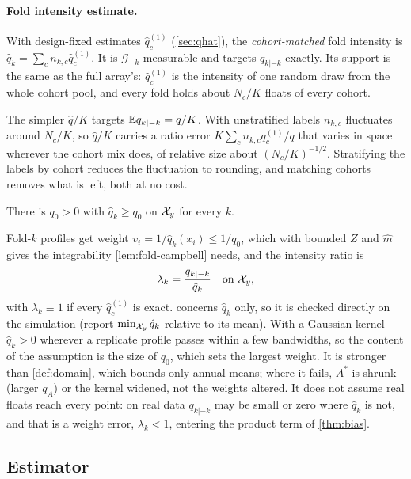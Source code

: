 \paragraph{Fold intensity estimate.} With design-fixed estimates $\hat q^{(1)}_c$ (\cref{sec:qhat}),
the \emph{cohort-matched} fold intensity is $\hat q_k=\sum_cn_{k,c}\hat q^{(1)}_c$. It is
$\mathcal G_{-k}$-measurable and targets $q_{k|-k}$ exactly. Its support is the same as the full
array's: $\hat q^{(1)}_c$ is the intensity of one random draw from the whole cohort pool, and every fold
holds about $N_c/K$ floats of every cohort.

\begin{remark}\label{rem:cohort}
The simpler $\hat q/K$ targets $\mathbb{E} q_{k|-k}=q/K$. With unstratified labels $n_{k,c}$ fluctuates around
$N_c/K$, so $\hat q/K$ carries a ratio error $K\sum_cn_{k,c}q^{(1)}_c/q$ that varies in space wherever
the cohort mix does, of relative size about $(N_c/K)^{-1/2}$. Stratifying the labels by cohort reduces
the fluctuation to rounding, and matching cohorts removes what is left, both at no cost.
\end{remark}

\begin{assumption}\label{ass:cover}
There is $q_0>0$ with $\hat q_k\ge q_0$ on $\mathcal{X}_y$ for every $k$.
\end{assumption}

Fold-$k$ profiles get weight $v_i=1/\hat q_k(x_i)\le1/q_0$, which with bounded $Z$ and $\hat m$ gives the
integrability \cref{lem:fold-campbell} needs, and the intensity ratio is
\[
  \lambda_k=\frac{q_{k|-k}}{\hat q_k}\quad\text{on }\mathcal{X}_y ,
\]
with $\lambda_k\equiv1$ if every $\hat q^{(1)}_c$ is exact.  concerns $\hat q_k$ only, so
it is checked directly on the simulation (report $\min_{\mathcal{X}_y}\hat q_k$ relative to its mean). With a
Gaussian kernel $\hat q_k>0$ wherever a replicate profile passes within a few bandwidths, so the content of
the assumption is the size of $q_0$, which sets the largest weight. It is stronger than
\cref{def:domain}, which bounds only annual means; where it fails, $A^*$ is shrunk (larger $q_A$) or the
kernel widened, not the weights altered. It does not assume
real floats reach every point: on real data $q_{k|-k}$ may be small or zero where $\hat q_k$ is not, and
that is a weight error, $\lambda_k<1$, entering the product term of \cref{thm:bias}.

\subsection{Estimator}

